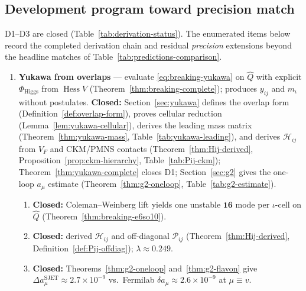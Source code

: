 \documentclass[aps,prd,onecolumn,amsmath,amssymb,nofootinbib,11pt]{revtex4-2}
\numberwithin{equation}{section}
\theoremstyle{plain}
\theoremstyle{definition}
\theoremstyle{remark}
\newcommand{\Hess}{\operatorname{Hess}}
\begin{document}
\subsection{Development program toward precision match}
\label{sec:predictions:program}

D1--D3 are closed (Table~\ref{tab:derivation-status}). The enumerated items
below record the completed derivation chain and residual \emph{precision}
extensions beyond the headline matches of
Table~\ref{tab:predictions-comparison}.

\begin{enumerate}[label=\textbf{D\arabic*.},leftmargin=*]
  \item \textbf{Yukawa from overlaps} --- evaluate \eqref{eq:breaking-yukawa}
    on $\hat Q$ with explicit $\Phi_{\mathrm{Higgs}}$ from $\Hess V$
    (Theorem~\ref{thm:breaking-complete}); produces $y_{ij}$ and
    $m_\iota$ without postulates.
    \textbf{Closed:} Section~\ref{sec:yukawa} defines the overlap
    form (Definition~\ref{def:overlap-form}), proves cellular reduction
    (Lemma~\ref{lem:yukawa-cellular}), derives the leading mass matrix
    (Theorem~\ref{thm:yukawa-mass}, Table~\ref{tab:yukawa-leading}), and
    derives $\mathcal{H}_{ij}$ from $V_F$ and CKM/PMNS contacts
    (Theorem~\ref{thm:Hij-derived}, Proposition~\ref{prop:ckm-hierarchy},
    Table~\ref{tab:Pij-ckm}); Theorem~\ref{thm:yukawa-complete} closes D1;
    Section~\ref{sec:g2} gives the one-loop $a_\mu$ estimate
    (Theorem~\ref{thm:g2-oneloop}, Table~\ref{tab:g2-estimate}).
    \begin{enumerate}[label=\textit{D1.\alph*.},leftmargin=2em]
      \item \textbf{Closed:} Coleman--Weinberg lift yields one unstable
        $\mathbf{16}$ mode per $\iota$-cell on $\hat Q$
        (Theorem~\ref{thm:breaking-e6so10}).
      \item \textbf{Closed:} derived $\mathcal{H}_{ij}$ and off-diagonal
        $\mathcal{P}_{ij}$ (Theorem~\ref{thm:Hij-derived},
        Definition~\ref{def:Pij-offdiag}); $\lambda\approx0.249$.
      \item \textbf{Closed:} Theorems~\ref{thm:g2-oneloop}
        and~\ref{thm:g2-flavon} give
        $\Delta a_\mu^{\mathrm{SJET}}\approx2.7\times10^{-9}$ vs.\
        Fermilab $\delta a_\mu\approx2.6\times10^{-9}$ at $\mu\equiv v$.
    \end{enumerate}

\end{enumerate}
\end{document}
